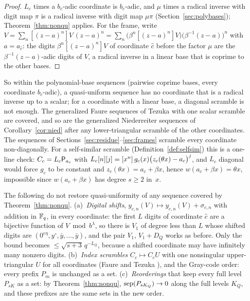 \begin{proof}
$L_c$ times a $b_c$-adic coordinate is $b_c$-adic, and $\mu$ times a radical inverse with digit map $\pi$ is a radical inverse with digit map $\mu\pi$ (Section~\ref{sec:polybases}); Theorem~\ref{thm:nonqu} applies. For the frame, write $V=\sum_n[(z-a)^n]V\,(z-a)^n=\sum_n\bigl(\beta^n[(z-a)^n]V\bigr)\bigl(\beta^{-1}(z-a)\bigr)^n$ with $a=a_{\hat c}$: the digits $\beta^n[(z-a)^n]V$ of coordinate $\hat c$ before the factor $\mu$ are the $\beta^{-1}(z-a)$-adic digits of $V$, a radical inverse in a linear base that is coprime to the other bases.
\end{proof}

So within the polynomial-base sequences (pairwise coprime bases, every coordinate $b_c$-adic), a quasi-uniform sequence has no coordinate that is a radical inverse up to a scalar; for a coordinate with a linear base, a diagonal scramble is not enough. The generalized Faure sequences of Tezuka \cite{Tez95} with one scalar scramble are covered, and so are the generalized Niederreiter sequences of Corollary~\ref{cor:nied} after any lower-triangular scramble of the other coordinates. The sequences of Sections~\ref{sec:residue}--\ref{sec:frames} scramble every coordinate non-diagonally. For a self-similar scramble (Definition~\ref{def:selfsim}) this is a one-line check: $C_c=L_c\mathsf{P}_{a_c}$ with $L_c[n][j]=[x^{n}]\,g_c(x)\bigl(z_c(\theta x)-a_c\bigr)^j$, and $L_c$ diagonal would force $g_c$ to be constant and $z_c(\theta x)=a_c+\beta x$, hence $w(a_c+\beta x)=\theta x$, impossible since $w(a_c+\beta x)$ has degree $s\ge2$ in~$x$.

\begin{remark}\label{rem:randomize}
The following do not restore quasi-uniformity of any sequence covered by Theorem~\ref{thm:nonqu}.
(a)~\emph{Digital shifts}, $y_{c,n}(V)\mapsto y_{c,n}(V)+\sigma_{c,n}$ with addition in $\mathbb{F}_q$, in every coordinate: the first $L$ digits of coordinate $\hat c$ are a bijective function of $V\bmod b^\lambda$, so there is $V_1$ of degree less than $L$ whose shifted digits are $(0^{e\eta},y^\circ,\bar y,\dots,\bar y)$, and the pair $V_1$, $V_1+D_Q$ works as before. Only the bound becomes $\le\sqrt{s+3}\,q^{-L_Q}$, because a shifted coordinate may have infinitely many nonzero digits.
(b)~\emph{Index scrambles} $C_c\mapsto C_cU$ with one nonsingular upper-triangular $U$ for all coordinates (Faure and Tezuka \cite{FT02}), and the Gray-code order: every prefix $P_m$ is unchanged as a set.
(c)~\emph{Reorderings} that keep every full level $P_{sK}$ as a set: by Theorem~\ref{thm:nonqu}, $\operatorname{sep}(P_{sK_Q})\to0$ along the full levels $K_Q$, and these prefixes are the same sets in the new order.
\end{remark}

